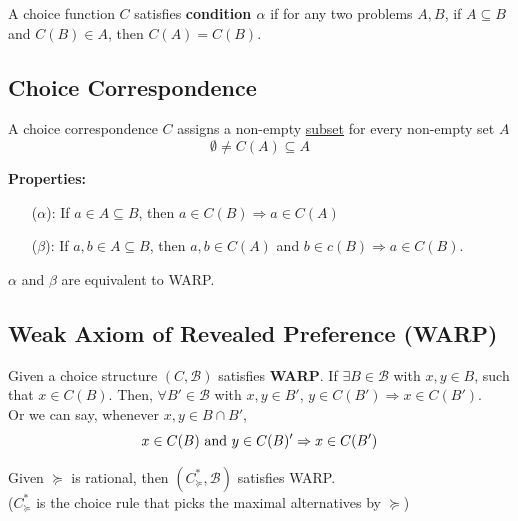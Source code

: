 \documentclass[11pt]{elegantbook}
\begin{document}
\begin{definition}
    \normalfont
    A choice function $C$ satisfies \textbf{condition $\alpha$} if for any two problems $A,B$, if $A\subseteq B$ and $C(B)\in A$, then $C(A)=C(B)$.
\end{definition}

\subsection{Choice Correspondence}
\begin{definition}
    \normalfont
    A choice correspondence $C$ assigns a non-empty \underline{subset} for every non-empty set $A$
    $$\emptyset\neq C(A)\subseteq A$$
\end{definition}
\textbf{Properties:}
\begin{enumerate}
    \item[($\alpha$):] If $a\in A\subseteq B$, then $a\in C(B) \Rightarrow a\in C(A)$
    \item[($\beta$):] If $a,b\in A\subseteq B$, then $a,b\in C(A)$ and $b\in c(B) \Rightarrow a\in C(B)$.
\end{enumerate}
$\alpha$ and $\beta$ are equivalent to WARP.


\subsection{Weak Axiom of Revealed Preference (WARP)}
\begin{definition}
    \normalfont
    Given a choice structure $(C,\mathcal{B})$ satisfies \textbf{WARP}. If $\exists B\in \mathcal{B}$ with $x,y\in B$, such that $x\in C(B)$. Then, $\forall B'\in \mathcal{B}$ with $x,y\in B'$, $y\in C(B') \Rightarrow x\in C(B')$.\\
    Or we can say, whenever $x,y\in B\cap B'$, $$x\in C(B) \textnormal{ and }y\in C(B)' \Rightarrow x\in C(B')$$
\end{definition}

\begin{proposition}
    Given $\succeq$ is rational, then $(C^*_{\succeq},\mathcal{B})$ satisfies WARP.\\
    ($C^*_{\succeq}$ is the choice rule that picks the maximal alternatives by $\succeq$)
\end{proposition}
\end{document}
